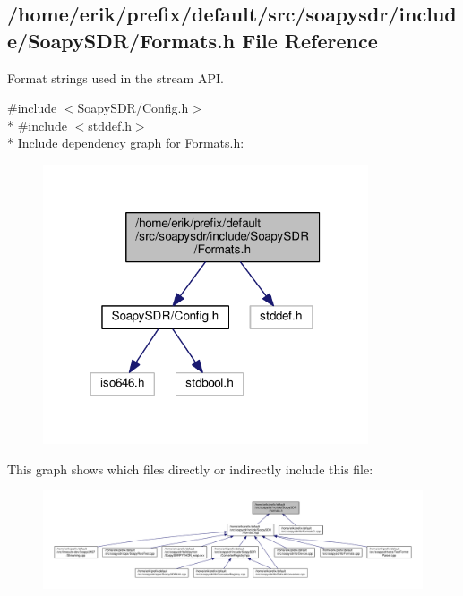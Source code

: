 \subsection{/home/erik/prefix/default/src/soapysdr/include/\+Soapy\+S\+D\+R/\+Formats.h File Reference}
\label{Formats_8h}


Format strings used in the stream A\+PI.  


{\ttfamily \#include $<$Soapy\+S\+D\+R/\+Config.\+h$>$}\\*
{\ttfamily \#include $<$stddef.\+h$>$}\\*
Include dependency graph for Formats.\+h\+:
\nopagebreak
\begin{figure}[H]
\begin{center}
\leavevmode
\includegraphics[width=272pt]{d9/d6a/Formats_8h__incl}
\end{center}
\end{figure}
This graph shows which files directly or indirectly include this file\+:
\nopagebreak
\begin{figure}[H]
\begin{center}
\leavevmode
\includegraphics[width=350pt]{d5/d4c/Formats_8h__dep__incl}
\end{center}
\end{figure}
